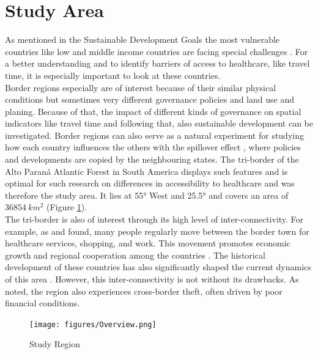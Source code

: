 \documentclass[11pt, a4paper]{report}
\begin{document}
\section{Study Area}\label{sec:introstudyarea}
As mentioned in the Sustainable Development Goals the most vulnerable countries like low and middle income countries are facing special challenges \citep{united_nations_transforming_2015}. For a better understanding and to identify barriers of access to healthcare, like travel time, it is especially important to look at these countries. \\
%
Border regions especially are of interest because of their similar physical conditions but sometimes very different governance policies and land use and planing. Because of that, the impact of different kinds of governance on spatial indicators like travel time and following that, also sustainable development can be investigated. Border regions can also serve as a natural experiment for studying how each country influences the others with the spillover effect \citep{piquer-rodriguez_land_2021}, where policies and developments are copied by the neighbouring states. The tri-border of the Alto Paraná Atlantic Forest in South America displays such features and is optimal for such research on differences in accessibility to healthcare and was therefore the study area. It lies at 55° West and 25.5° and covers an area of  $36854 \ km^2$ (Figure \ref{fig:studyregion}). \\
%
The tri-border is also of interest through its high level of inter-connectivity. For example, as \citet{marques_circularidad_2013} and \citet{cardelli_caso_2021} found, many people regularly move between the border town for healthcare services, shopping, and work. This movement promotes economic growth and regional cooperation among the countries  \citep{arsentyeva_triple_2020}. The historical development of these countries has also significantly shaped the current dynamics of this area  \citep{lisboa_path_2021}. However, this inter-connectivity is not without its drawbacks. As \citet{martens_ilegalismos_2019} noted, the region also experiences cross-border theft, often driven by poor financial conditions.

\begin{figure}
  \centering
  \texttt{[image: figures/Overview.png]}
  \caption{Study Region}
  \label{fig:studyregion}
\end{figure}
\end{document}
